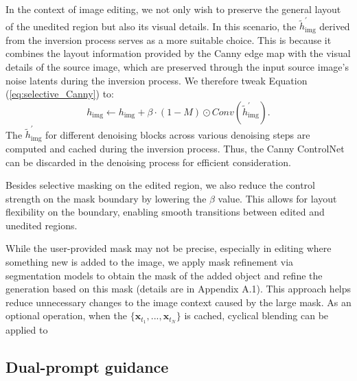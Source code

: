 \documentclass{article}
\newenvironment{cyanpar}{\color{cyan}}{}
\begin{document}
In the context of image editing, we not only wish to preserve the general layout of the unedited region but also its visual details. In this scenario, the $\tilde{h}^{\prime}_{\text{img}}$ derived from the inversion process serves as a more suitable choice. This is because it combines the layout information provided by the Canny edge map with the visual details of the source image, which are preserved through the input source image's noise latents during the inversion process. We therefore tweak Equation (\ref{eq:selective_Canny}) to:
\begin{equation}
h_{\text{img}} \leftarrow h_{\text{img}} + \beta\cdot (1-M) \odot Conv(\tilde{h}^{\prime}_{\text{img}}).
\label{eq:selective_Canny2}
\end{equation}
The $\tilde{h}^{\prime}_{\text{img}}$ for different denoising blocks across various denoising steps are computed and cached during the inversion process. Thus, the Canny ControlNet can be discarded in the denoising process for efficient consideration.

\begin{cyanpar}
Besides selective masking on the edited region, we also reduce the control strength on the mask boundary by lowering the $\beta$ value. This allows for layout flexibility on the boundary, enabling smooth transitions between edited and unedited regions.  

While the user-provided mask may not be precise, especially in editing where something new is added to the image, we apply mask refinement via segmentation models \citep{kirillov2023segment,ravi2024sam,medeiros2024langsegmentanything} to obtain the mask of the added object and refine the generation based on this mask (details are in Appendix A.1). This approach helps reduce unnecessary changes to the image context caused by the large mask. As an optional operation, when the $\{\mathbf{x}_{t_{1}},...,\mathbf{x}_{t_{N}}\}$ is cached, cyclical blending can be applied to 



\end{cyanpar}


\subsection{Dual-prompt guidance}
\label{sec:dualprompt}
\end{document}

